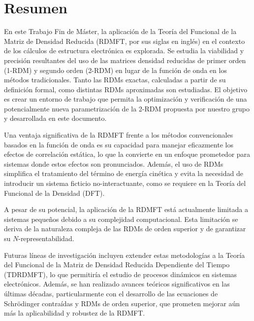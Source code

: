 \section*{Resumen}
En este Trabajo Fin de Máster, la aplicación de la Teoría del Funcional de la
Matriz de Densidad Reducida (RDMFT, por sus siglas en inglés) en el contexto de
los cálculos de estructura electrónica es explorada.
Se estudia la viabilidad y precisión resultantes del uso de las
matrices densidad reducidas de primer orden (1-RDM) y segundo orden (2-RDM)
en lugar de la función de onda en los métodos tradicionales.
Tanto las RDMs exactas, calculadas a partir de su definición formal, como 
distintas RDMs aproximadas son estudiadas.
El objetivo es crear un entorno de trabajo que permita la optimización y 
verificación de una potencialmente nueva parametrización de la 2-RDM propuesta
por nuestro grupo y desarrollada en este documento.

Una ventaja significativa de la RDMFT frente a los métodos convencionales
basados en la función de onda es su capacidad para manejar eficazmente los 
efectos de correlación estática, lo que la convierte en un enfoque prometedor 
para sistemas donde estos efectos son pronunciados.
Además, el  uso de RDMs simplifica el tratamiento
del término de energía cinética y evita la necesidad de introducir un
sistema ficticio no-interactuante, como se requiere en la Teoría del Funcional de la
Densidad (DFT).

A pesar de su potencial, la aplicación de la RDMFT está actualmente limitada a 
sistemas pequeños debido a su complejidad computacional.
Esta limitación se deriva de la naturaleza compleja
de las RDMs de orden superior y de garantizar su
$N$-representabilidad.

Futuras líneas de investigación incluyen extender estas metodologías 
a la Teoría del Funcional de la Matriz de Densidad 
Reducida Dependiente del Tiempo (TDRDMFT), lo que 
permitiría el estudio de procesos dinámicos en sistemas electrónicos.
Además, se han realizado avances teóricos significativos en las últimas décadas,
particularmente con el desarrollo de las ecuaciones de Schrödinger contraídas y 
RDMs de orden superior, que prometen mejorar aún más 
la aplicabilidad y robustez de la RDMFT.

